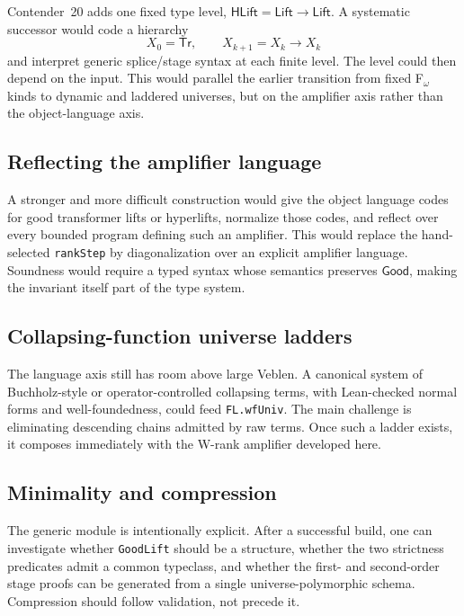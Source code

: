 \documentclass[11pt]{article}
\theoremstyle{definition}
\theoremstyle{remark}
\newcommand{\code}[1]{\texttt{#1}}
\newcommand{\Tr}{\mathsf{Tr}}
\newcommand{\Lift}{\mathsf{Lift}}
\newcommand{\HLift}{\mathsf{HLift}}
\newcommand{\Good}{\mathsf{Good}}
\begin{document}
Contender~20 adds one fixed type level, \(\HLift=\Lift\to\Lift\).  A systematic
successor would code a hierarchy
\[
X_0=\Tr,\qquad X_{k+1}=X_k\to X_k
\]
and interpret generic splice/stage syntax at each finite level.  The level
could then depend on the input.  This would parallel the earlier transition
from fixed F$_\omega$ kinds to dynamic and laddered universes, but on the
amplifier axis rather than the object-language axis.

\subsection{Reflecting the amplifier language}

A stronger and more difficult construction would give the object language
codes for good transformer lifts or hyperlifts, normalize those codes, and
reflect over every bounded program defining such an amplifier.  This would
replace the hand-selected \code{rankStep} by diagonalization over an explicit
amplifier language.  Soundness would require a typed syntax whose semantics
preserves \(\Good\), making the invariant itself part of the type system.

\subsection{Collapsing-function universe ladders}

The language axis still has room above large Veblen.  A canonical system of
Buchholz-style or operator-controlled collapsing terms, with Lean-checked
normal forms and well-foundedness, could feed \code{FL.wfUniv}.  The main
challenge is eliminating descending chains admitted by raw terms.  Once such a
ladder exists, it composes immediately with the W-rank amplifier developed
here.

\subsection{Minimality and compression}

The generic module is intentionally explicit.  After a successful build, one
can investigate whether \code{GoodLift} should be a structure, whether the two
strictness predicates admit a common typeclass, and whether the first- and
second-order stage proofs can be generated from a single universe-polymorphic
schema.  Compression should follow validation, not precede it.

\end{document}

